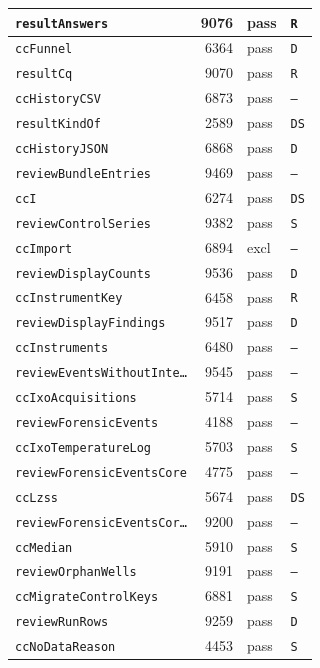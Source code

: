 {\begin{xltabular}{\linewidth}{|l|r|X|X|}
\texttt{resultAnswers} & 9076 & pass & \texttt{R} \\ \hline
\texttt{ccFunnel} & 6364 & pass & \texttt{D} \\ \hline
\texttt{resultCq} & 9070 & pass & \texttt{R} \\ \hline
\texttt{ccHistoryCSV} & 6873 & pass & \texttt{--} \\ \hline
\texttt{resultKindOf} & 2589 & pass & \texttt{DS} \\ \hline
\texttt{ccHistoryJSON} & 6868 & pass & \texttt{D} \\ \hline
\texttt{reviewBundleEntries} & 9469 & pass & \texttt{--} \\ \hline
\texttt{ccI} & 6274 & pass & \texttt{DS} \\ \hline
\texttt{reviewControlSeries} & 9382 & pass & \texttt{S} \\ \hline
\texttt{ccImport} & 6894 & excl & \texttt{--} \\ \hline
\texttt{reviewDisplayCounts} & 9536 & pass & \texttt{D} \\ \hline
\texttt{ccInstrumentKey} & 6458 & pass & \texttt{R} \\ \hline
\texttt{reviewDisplayFindings} & 9517 & pass & \texttt{D} \\ \hline
\texttt{ccInstruments} & 6480 & pass & \texttt{--} \\ \hline
\texttt{reviewEventsWithoutInte…} & 9545 & pass & \texttt{--} \\ \hline
\texttt{ccIxoAcquisitions} & 5714 & pass & \texttt{S} \\ \hline
\texttt{reviewForensicEvents} & 4188 & pass & \texttt{--} \\ \hline
\texttt{ccIxoTemperatureLog} & 5703 & pass & \texttt{S} \\ \hline
\texttt{reviewForensicEventsCore} & 4775 & pass & \texttt{--} \\ \hline
\texttt{ccLzss} & 5674 & pass & \texttt{DS} \\ \hline
\texttt{reviewForensicEventsCor…} & 9200 & pass & \texttt{--} \\ \hline
\texttt{ccMedian} & 5910 & pass & \texttt{S} \\ \hline
\texttt{reviewOrphanWells} & 9191 & pass & \texttt{--} \\ \hline
\texttt{ccMigrateControlKeys} & 6881 & pass & \texttt{S} \\ \hline
\texttt{reviewRunRows} & 9259 & pass & \texttt{D} \\ \hline
\texttt{ccNoDataReason} & 4453 & pass & \texttt{S} \\ \hline

\end{xltabular}}
